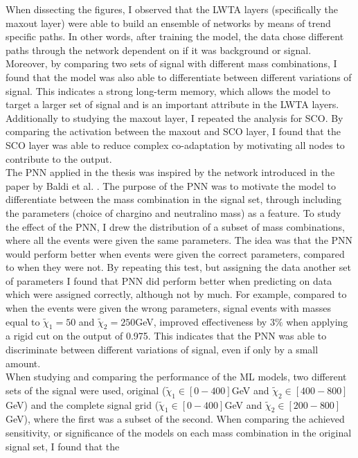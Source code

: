 When dissecting the figures, I observed that the \ac{LWTA} layers (specifically the maxout layer) were able to build an ensemble of networks by means of trend specific paths. In other words, after training 
the model, the data chose different paths through the network dependent on if it was background or signal. Moreover, by comparing two sets of signal with different mass combinations, I found that the model 
was also able to differentiate between different variations of signal. This indicates a strong long-term memory, which allows the model to target a larger set of signal and is an important attribute
in the \ac{LWTA} layers. Additionally to studying the maxout layer, I repeated the analysis for \ac{SCO}. By comparing the activation between the maxout and \ac{SCO} layer, I found that the \ac{SCO} layer 
was able to reduce complex co-adaptation by motivating all nodes to contribute to the output.
\\\newline
The \ac{PNN} applied in the thesis was inspired by the network introduced in the paper by Baldi et al. \cite{PNN}. The purpose of the \ac{PNN} was to motivate the model to differentiate between the mass combination 
in the signal set, through including the parameters (choice of chargino and neutralino mass) as a feature. To study the effect of the \ac{PNN}, I drew the distribution of a subset of mass combinations, where all the events were given the same parameters.
The idea was that the \ac{PNN} would perform better when events were given the correct parameters, compared to when they were not. By repeating this test, but assigning the data another set of parameters I found that \ac{PNN} did 
perform better when predicting on data which were assigned correctly, although not by much. For example, compared to when the events were given the wrong parameters, signal events with masses equal to $\tilde{\chi}_1=50$ 
and $\tilde{\chi}_2=250$GeV, improved effectiveness by $3\%$ when applying a rigid cut on the output of 0.975. This indicates that the \ac{PNN} was able to discriminate between different variations of signal, even if only by 
a small amount.
\\\newline
When studying and comparing the performance of the \ac{ML} models, two different sets of the signal were used, original ($\tilde{\chi}_1\in[0-400]$GeV and  $\tilde{\chi}_2\in[400-800]$GeV) and the complete signal grid ($\tilde{\chi}_1\in[0-400]$GeV 
and $\tilde{\chi}_2\in[200-800]$GeV), where the first was a subset of the second. When comparing the achieved sensitivity, or significance of the models on each mass combination in the original signal set, I found that the 
